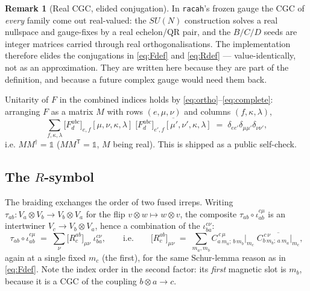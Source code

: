 \documentclass[11pt,a4paper]{article}
\theoremstyle{plain}
\theoremstyle{definition}
\newtheorem{remark}[theorem]{Remark}
\newcommand{\id}{\mathbb{1}}
\newcommand{\code}[1]{\texttt{#1}}
\begin{document}
\begin{remark}[Real CGC, elided conjugation]\label{rem:real}
In \code{racah}'s frozen gauge the CGC of \emph{every} family come out
real-valued: the $SU(N)$ construction solves a real nullspace and gauge-fixes
by a real echelon/QR pair, and the $B/C/D$ seeds are integer matrices carried
through real orthogonalisations. The implementation therefore elides the
conjugations in \eqref{eq:Fdef} and \eqref{eq:Rdef} --- value-identically, not
as an approximation. They are written here because they are part of the
definition, and because a future complex gauge would need them back.
\end{remark}

Unitarity of $F$ in the combined indices holds by
\eqref{eq:ortho}--\eqref{eq:complete}: arranging $F$ as a matrix $M$ with rows
$(e,\mu,\nu)$ and columns $(f,\kappa,\lambda)$,
\begin{equation}\label{eq:funitary}
  \sum_{f,\kappa,\lambda}
    \bigl[F^{abc}_d\bigr]_{e,f}[\mu,\nu,\kappa,\lambda]\;
    \overline{\bigl[F^{abc}_d\bigr]_{e',f}[\mu',\nu',\kappa,\lambda]}
  \;=\; \delta_{ee'}\delta_{\mu\mu'}\delta_{\nu\nu'} ,
\end{equation}
i.e. $M M^\dagger = \id$ ($M M^{\mathsf T} = \id$, $M$ being real). This is
shipped as a public self-check.

\subsection{The $R$-symbol}

The braiding exchanges the order of two fused irreps. Writing
$\tau_{ab}: V_a\otimes V_b \to V_b\otimes V_a$ for the flip $v\otimes w\mapsto
w\otimes v$, the composite $\tau_{ab}\circ\iota^{c\mu}_{ab}$ is an intertwiner
$V_c\to V_b\otimes V_a$, hence a combination of the $\iota^{c\nu}_{ba}$:
\begin{equation}\label{eq:Rdef}
  \tau_{ab}\circ \iota^{c\mu}_{ab}
  \;=\; \sum_{\nu} \bigl[R^{ab}_{c}\bigr]_{\mu\nu}\; \iota^{c\nu}_{ba},
  \qquad\text{i.e.}\qquad
  \bigl[R^{ab}_{c}\bigr]_{\mu\nu}
  \;=\; \sum_{m_a,m_b}
     C^{\,c\,\mu}_{a\,m_a;\,b\,m_b}\Big|_{m_c}\;
     \overline{C^{\,c\,\nu}_{b\,m_b;\,a\,m_a}\Big|_{m_c}} ,
\end{equation}
again at a single fixed $m_c$ (the first), for the same Schur-lemma reason as
in \eqref{eq:Fdef}. Note the index order in the second factor: its \emph{first}
magnetic slot is $m_b$, because it is a CGC of the coupling $b\otimes a\to c$.
\end{document}
